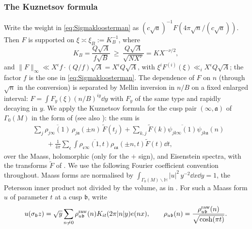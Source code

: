 \documentclass[11pt,colorlinks]{charlie}
\begin{document}
\subsubsection{The Kuznetsov formula}
Write the weight in \eqref{eq:Sigmakloosterman} as $(c\sqrt a)^{-1}F(4\pi\sqrt n/(c\sqrt a))$. Then $F$ is supported on $\xi\asymp\xi_B:=K_B^{-1}$, where
\[
 K_B=\frac{Q\sqrt A}{f\sqrt B}\ \ge\ \frac{Q\sqrt A}{\sqrt{NX^\nu}}=KX^{-\nu/2},
\]
and $\|F\|_\infty\ll X^\epsilon f\cdot(Q/f)\sqrt A=X^\epsilon Q\sqrt A$, with $\xi^iF^{(i)}(\xi)\ll_iX^{\epsilon}Q\sqrt A$; the factor $f$ is the one in \eqref{eq:Sigmakloosterman}. The dependence of $F$ on $n$ (through $\sqrt n$ in the conversion) is separated by Mellin inversion in $n/B$ on a fixed enlarged interval: $F=\int F_y(\xi)(n/B)^{iy}\dd y$ with $F_y$ of the same type and rapidly decaying in $y$. We apply the Kuznetsov formula for the cusp pair $(\infty,\mathfrak a)$ of $\Gamma_0(M)$ in the form of \cite[Theorem~1]{DI} (see also \cite[Theorems~9.4,~9.8]{IwSpec}): the sum is
\begin{equation}\label{eq:kuznetsov}
 \begin{split}
 &\sum_j\overline{\rho_{j\infty}(1)}\,\rho_{j\mathfrak a}(\pm n)\,\widetilde F(t_j)+\sum_{k,j}\widetilde F(k)\overline{\psi_{jk\infty}(1)}\psi_{jk\mathfrak a}(n)\\
 &\qquad+\frac1{4\pi}\sum_{\mathfrak c}\int\overline{\rho_{\mathfrak c\infty}(1,t)}\rho_{\mathfrak c\mathfrak a}(\pm n,t)\widetilde F(t)\dd t,
 \end{split}
\end{equation}
over the Maass, holomorphic (only for the $+$ sign), and Eisenstein spectra, with the transforms $\widetilde F$ of \cite{DI}. We use the following Fourier coefficient convention throughout. Maass forms are normalised by $\int_{\Gamma_0(M)\backslash\mathbb H}|u|^2\,y^{-2}\dd x\dd y=1$, the Petersson inner product not divided by the volume, as in \cite{DI}. For such a Maass form $u$ of parameter $t$ at a cusp $\mathfrak b$, write
\[
 u(\sigma_{\mathfrak b}z)=\sqrt y\sum_{n\ne0}\rho^{\rm raw}_{u\mathfrak b}(n)K_{it}(2\pi|n|y)e(nx),
 \qquad \rho_{u\mathfrak b}(n)=\frac{\rho^{\rm raw}_{u\mathfrak b}(n)}{\sqrt{\cosh(\pi t)}} .
\]
\end{document}
